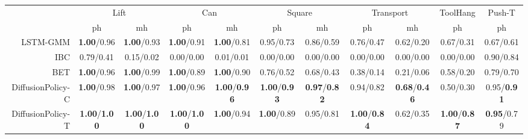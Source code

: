 \documentclass[Afour,sageh,times]{sagej}
\begin{document}
\begin{table}[h]
{%
\setlength\tabcolsep{ 3 pt}
\begin{tabular}{r|cc|cc|cc|cc|c|c}
\toprule
 & \multicolumn{2}{c|}{Lift} & \multicolumn{2}{c|}{Can} & \multicolumn{2}{c|}{Square} & \multicolumn{2}{c|}{Transport} & \multicolumn{1}{c|}{ToolHang} & \multicolumn{1}{c}{Push-T} \\
 & ph & mh & ph & mh & ph & mh & ph & mh & ph & ph \\
\midrule
LSTM-GMM & \small \textbf{1.00}/0.96 & \small \textbf{1.00}/0.93 & \small \textbf{1.00}/0.91 & \small \textbf{1.00}/0.81 & \small 0.95/0.73 & \small 0.86/0.59 & \small 0.76/0.47 & \small 0.62/0.20 & \small 0.67/0.31 & \small 0.67/0.61 \\
IBC & \small 0.79/0.41 & \small 0.15/0.02 & \small 0.00/0.00 & \small 0.01/0.01 & \small 0.00/0.00 & \small 0.00/0.00 & \small 0.00/0.00 & \small 0.00/0.00 & \small 0.00/0.00 & \small 0.90/0.84 \\
BET & \small \textbf{1.00}/0.96 & \small \textbf{1.00}/0.99 & \small \textbf{1.00}/0.89 & \small \textbf{1.00}/0.90 & \small 0.76/0.52 & \small 0.68/0.43 & \small 0.38/0.14 & \small 0.21/0.06 & \small 0.58/0.20 & \small 0.79/0.70 \\
\midrule
DiffusionPolicy-C & \small \textbf{1.00}/0.98 & \small \textbf{1.00}/0.97 & \small \textbf{1.00}/0.96 & \small \textbf{1.00}/\textbf{0.96} & \small \textbf{1.00}/\textbf{0.93} & \small \textbf{0.97}/\textbf{0.82} & \small 0.94/0.82 & \small \textbf{0.68}/\textbf{0.46} & \small 0.50/0.30 & \small 0.95/\textbf{0.91} \\
DiffusionPolicy-T & \small \textbf{1.00}/\textbf{1.00} & \small \textbf{1.00}/\textbf{1.00} & \small \textbf{1.00}/\textbf{1.00} & \small \textbf{1.00}/0.94 & \small \textbf{1.00}/0.89 & \small 0.95/0.81 & \small \textbf{1.00}/\textbf{0.84} & \small 0.62/0.35 & \small \textbf{1.00}/\textbf{0.87} & \small \textbf{0.95}/0.79 \\
\bottomrule
\end{tabular}

}
\end{table}
\end{document}
